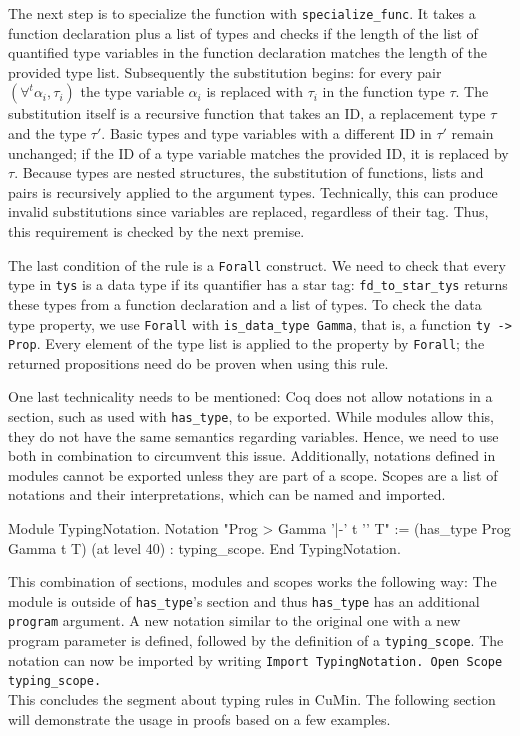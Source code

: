 \documentclass[paper = a4, fleqn, abstract=on, twoside]{scrreprt}
\newcommand{\coqinline}[1]{\texttt{#1}}
\begin{document}
 \par
 The next step is to specialize the function with \coqinline{specialize_func}. It takes a function declaration plus a list of types and checks if the length of the list of quantified type variables in the function declaration matches the length of the provided type list. Subsequently the substitution begins: for every pair $(\forall^{t}\alpha_{i}, \tau_{i})$ the type variable $\alpha_{i}$ is replaced with $\tau_{i}$ in the function type $\tau$. The substitution itself is a recursive function that takes an ID, a replacement type $\tau$ and the type $\tau'$. Basic types and type variables with a different ID in $\tau'$ remain unchanged; if the ID of a type variable matches the provided ID, it is replaced by $\tau$. Because types are nested structures, the substitution of functions, lists and pairs is recursively applied to the argument types. Technically, this can produce invalid substitutions since variables are replaced, regardless of their tag. Thus, this requirement is checked by the next premise.
 \par
 The last condition of the rule is a \coqinline{Forall} construct. We need to check that every type in \coqinline{tys} is a data type if its quantifier has a star tag: \coqinline{fd_to_star_tys} returns these types from a function declaration and a list of types. To check the data type property, we use \coqinline{Forall} with \coqinline{is_data_type Gamma}, that is, a function \coqinline{ty -> Prop}. Every element of the type list is applied to the property by \coqinline{Forall}; the returned propositions need do be proven when using this rule.
 \par
 One last technicality needs to be mentioned: Coq does not allow notations in a section, such as used with \coqinline{has_type}, to be exported. While modules allow this, they do not have the same semantics regarding variables. Hence, we need to use both in combination to circumvent this issue. Additionally, notations defined in modules cannot be exported unless they are part of a scope. Scopes are a list of notations and their interpretations, which can be named and imported.
 \begin{coqcode}
 Module TypingNotation.
   Notation "Prog > Gamma '|-' t '\in' T" := (has_type Prog Gamma t T)
   (at level 40) : typing_scope.
 End TypingNotation.
 \end{coqcode}
 This combination of sections, modules and scopes works the following way: The module is outside of \coqinline{has_type}'s section and thus \coqinline{has_type} has an additional \coqinline{program} argument. A new notation similar to the original one with a new program parameter is defined, followed by the definition of a \coqinline{typing_scope}.
 The notation can now be imported by writing \coqinline{Import TypingNotation. Open Scope typing_scope.}\\
 This concludes the segment about typing rules in CuMin. The following section will demonstrate the usage in proofs based on a few examples.
\end{document}
